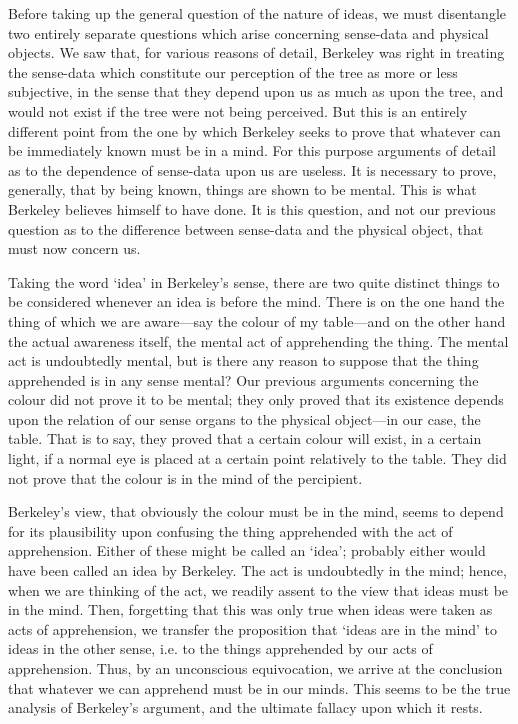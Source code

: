 \documentclass[oneside,letterpaper,12pt]{book}
\begin{document}
Before taking up the general question of the nature of ideas, we must
disentangle two entirely separate questions which arise concerning
sense-data and physical objects. We saw that, for various reasons of
detail, Berkeley was right in treating the sense-data which constitute
our perception of the tree as more or less subjective, in the sense that
they depend upon us as much as upon the tree, and would not exist if the
tree were not being perceived. But this is an entirely different point
from the one by which Berkeley seeks to prove that whatever can be
immediately known must be in a mind. For this purpose arguments of
detail as to the dependence of sense-data upon us are useless. It is
necessary to prove, generally, that by being known, things are shown to
be mental. This is what Berkeley believes himself to have done. It is
this question, and not our previous question as to the difference
between sense-data and the physical object, that must now concern us.

Taking the word `idea' in
Berkeley's sense, there are two quite distinct things to
be considered whenever an idea is before the mind. \label{act-object}There is on the one
hand the thing of which we are aware---say the colour of my table---and
on the other hand the actual awareness itself, the mental act of
apprehending the thing. The mental act is undoubtedly mental, but is
there any reason to suppose that the thing apprehended is in any sense
mental? Our previous arguments concerning the colour did not prove it to
be mental; they only proved that its existence depends upon the relation
of our sense organs to the physical object---in our case, the table.
That is to say, they proved that a certain colour will exist, in a
certain light, if a normal eye is placed at a certain point relatively
to the table. They did not prove that the colour is in the mind of the
percipient.

Berkeley's view, that obviously the colour must be in
the mind, seems to depend for its plausibility upon confusing the thing
apprehended with the act of apprehension. Either of these might be
called an `idea'; probably either would
have been called an idea by Berkeley. The act is undoubtedly in the
mind; hence, when we are thinking of the act, we readily assent to the
view that ideas must be in the mind. Then, forgetting that this was only
true when ideas were taken as acts of apprehension, we transfer the
proposition that `ideas are in the
mind' to ideas in the other sense, i.e. to the things
apprehended by our acts of apprehension. \label{apprehension} Thus, by an unconscious
equivocation, we arrive at the conclusion that whatever we can apprehend
must be in our minds. This seems to be the true analysis of
Berkeley's argument, and the ultimate fallacy upon which
it rests.
\end{document}
